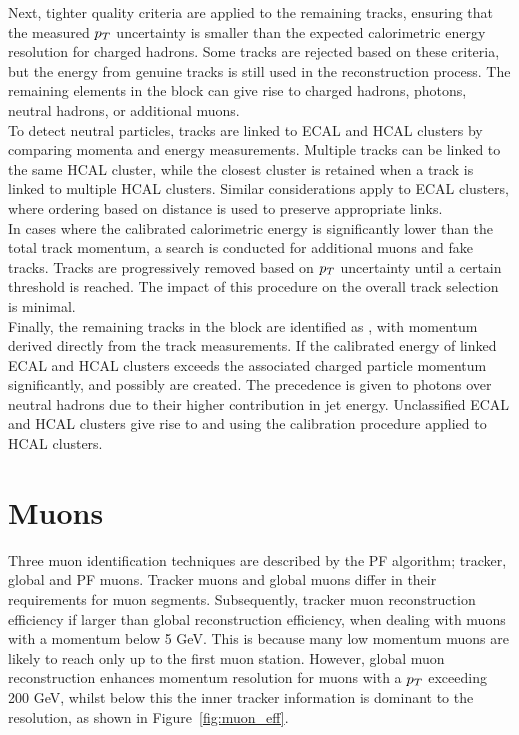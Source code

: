 Next, tighter quality criteria are applied to the remaining tracks, ensuring that the measured $p_{T}$ uncertainty is smaller than the expected calorimetric energy resolution for charged hadrons. 
Some tracks are rejected based on these criteria, but the energy from genuine tracks is still used in the reconstruction process. 
The remaining elements in the block can give rise to charged hadrons, photons, neutral hadrons, or additional muons. \\

To detect neutral particles, tracks are linked to \ac{ECAL} and \ac{HCAL} clusters by comparing momenta and energy measurements. 
Multiple tracks can be linked to the same \ac{HCAL} cluster, while the closest cluster is retained when a track is linked to multiple \ac{HCAL} clusters. 
Similar considerations apply to \ac{ECAL} clusters, where ordering based on distance is used to preserve appropriate links. \\

In cases where the calibrated calorimetric energy is significantly lower than the total track momentum, a search is conducted for additional muons and fake tracks. 
Tracks are progressively removed based on $p_{T}$ uncertainty until a certain threshold is reached. 
The impact of this procedure on the overall track selection is minimal. \\

Finally, the remaining tracks in the block are identified as , with momentum derived directly from the track measurements. 
If the calibrated energy of linked \ac{ECAL} and \ac{HCAL} clusters exceeds the associated charged particle momentum significantly,  and possibly  are created. 
The precedence is given to photons over neutral hadrons due to their higher contribution in jet energy. 
Unclassified \ac{ECAL} and \ac{HCAL} clusters give rise to  and  using the calibration procedure applied to \ac{HCAL} clusters.

\section{Muons}

Three muon identification techniques are described by the \ac{PF} algorithm; tracker, global and \ac{PF} muons.
Tracker muons and global muons differ in their requirements for muon segments. 
Subsequently, tracker muon reconstruction efficiency if larger than global reconstruction efficiency, when dealing with muons with a momentum below 5 GeV. 
This is because many low momentum muons are likely to reach only up to the first muon station. 
However, global muon reconstruction enhances momentum resolution for muons with a $p_{T}$ exceeding 200 GeV, whilst below this the inner tracker information is dominant to the resolution, as shown in Figure~\ref{fig:muon_eff}. \\

